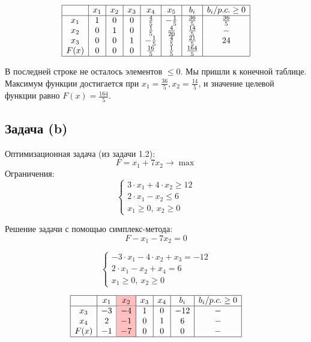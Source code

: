 \documentclass{article}
\begin{document}
\[
    \begin{array}{|c|c|c|c|c|c|c|c|}
        \hline
             & x_1 & x_2 & x_3 & x_4          & x_5          & b_i           & b_i/p.c. \geq 0 \\
        \hline
        x_1  & 1   & 0   & 0   & \frac{4}{5}  & -\frac{1}{5} & \frac{36}{5}  & \frac{36}{5}    \\
        x_2  & 0   & 1   & 0   & \frac{1}{5}  & \frac{4}{20} & \frac{14}{5}  & -               \\
        x_3  & 0   & 0   & 1   & -\frac{1}{5} & \frac{4}{5}  & \frac{21}{5}  & 24              \\
        F(x) & 0   & 0   & 0   & \frac{16}{5} & \frac{1}{5}  & \frac{164}{5} &                 \\
        \hline
    \end{array}
\]

В последней строке не осталось элементов \(\leq 0\). Мы пришли к конечной таблице.\\
Максимум функции достигается при \(x_1 = \frac{36}{5}, x_2 = \frac{14}{5}\), и значение целевой функции равно \(F(x) = \frac{164}{5}\).

\newpage

\subsection{Задача (b)}

Оптимизационная задача (из задачи 1.2):
\[
    F = x_1 + 7x_2 \to \max
\]
Ограничения:
\[
    \begin{cases}
        3 \cdot x_1 + 4 \cdot x_2 \geq 12 \\
        2 \cdot x_1 - x_2 \leq 6          \\
        x_1 \geq 0, \ x_2 \geq 0
    \end{cases}
\]

Решение задачи с помощью симплекс-метода:
\[
    F - x_1 - 7x_2 = 0
\]

\[
    \begin{cases}
        -3 \cdot x_1 - 4 \cdot x_2 + x_3 =  -12 \\
        2 \cdot x_1 - x_2 + x_4 = 6             \\
        x_1 \geq 0, \ x_2 \geq 0
    \end{cases}
\]

\vspace{25pt}

\[
    \begin{array}{|c|c|>{\columncolor{pink}}c|c|c|c|c|}
        \hline
             & x_1 & x_2 & x_3 & x_4 & b_i & b_i/p.c. \geq 0 \\
        \hline
        x_3  & -3  & -4  & 1   & 0   & -12 & -               \\
        x_4  & 2   & -1  & 0   & 1   & 6   & -               \\
        F(x) & -1  & -7  & 0   & 0   & 0   & -               \\
        \hline
    \end{array}
\]
\end{document}
